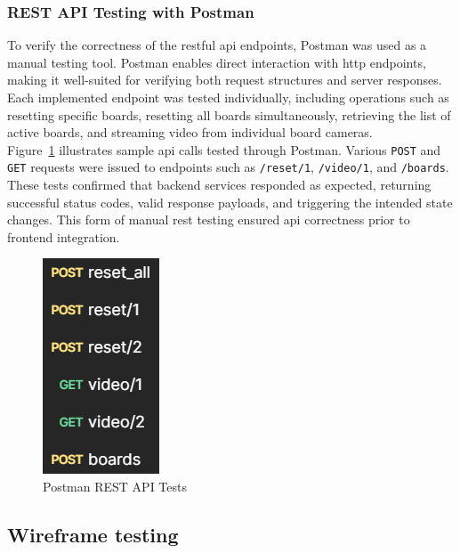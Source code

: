 \subsubsection*{REST API Testing with Postman}
\label{subsubsec:rest-api-methods}

To verify the correctness of the \gls{rest}ful \gls{api} endpoints, Postman was used as a manual testing tool. Postman enables direct interaction with \gls{http} endpoints, making it well-suited for verifying both request structures and server responses. Each implemented endpoint was tested individually, including operations such as resetting specific boards, resetting all boards simultaneously, retrieving the list of active boards, and streaming video from individual board cameras. \\

Figure~\ref{fig:postman-rest-tests} illustrates sample \gls{api} calls tested through Postman. Various \texttt{POST} and \texttt{GET} requests were issued to endpoints such as \texttt{/reset/1}, \texttt{/video/1}, and \texttt{/boards}. These tests confirmed that backend services responded as expected, returning successful status codes, valid response payloads, and triggering the intended state changes. This form of manual \gls{rest} testing ensured \gls{api} correctness prior to frontend integration.

\begin{figure}[h!]
    \centering
    \includegraphics[width=0.25\linewidth]{figures/results/postman.png}
    \caption{Postman REST API Tests}
    \label{fig:postman-rest-tests}
\end{figure}



\subsection{Wireframe testing}
\label{subsubsec:user-centered-design}

